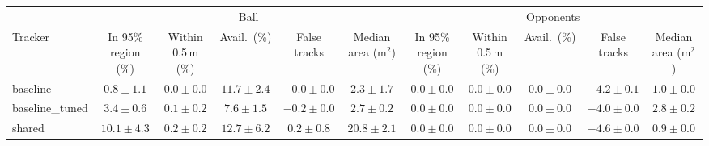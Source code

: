 \begin{tabular}{lcccccccccc}
\toprule
 & \multicolumn{5}{c}{Ball} & \multicolumn{5}{c}{Opponents} \\
\cmidrule(lr){2-6}\cmidrule(lr){7-11}
Tracker & In 95\% region (\%) & Within 0.5\,m (\%) & Avail.\ (\%) & False tracks & Median area (m$^2$) & In 95\% region (\%) & Within 0.5\,m (\%) & Avail.\ (\%) & False tracks & Median area (m$^2$) \\
\midrule
baseline & $0.8 \pm 1.1$ & $0.0 \pm 0.0$ & $11.7 \pm 2.4$ & $-0.0 \pm 0.0$ & $2.3 \pm 1.7$ & $0.0 \pm 0.0$ & $0.0 \pm 0.0$ & $0.0 \pm 0.0$ & $-4.2 \pm 0.1$ & $1.0 \pm 0.0$ \\
baseline\_tuned & $3.4 \pm 0.6$ & $0.1 \pm 0.2$ & $7.6 \pm 1.5$ & $-0.2 \pm 0.0$ & $2.7 \pm 0.2$ & $0.0 \pm 0.0$ & $0.0 \pm 0.0$ & $0.0 \pm 0.0$ & $-4.0 \pm 0.0$ & $2.8 \pm 0.2$ \\
shared & $10.1 \pm 4.3$ & $0.2 \pm 0.2$ & $12.7 \pm 6.2$ & $0.2 \pm 0.8$ & $20.8 \pm 2.1$ & $0.0 \pm 0.0$ & $0.0 \pm 0.0$ & $0.0 \pm 0.0$ & $-4.6 \pm 0.0$ & $0.9 \pm 0.0$ \\
\bottomrule
\end{tabular}
